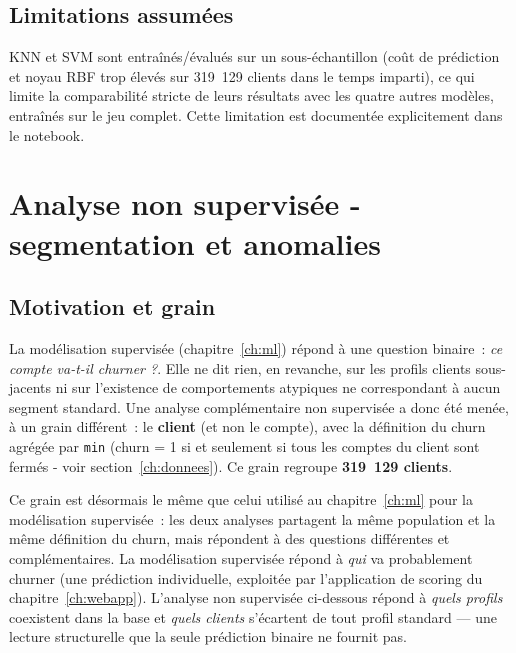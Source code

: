 \documentclass[11pt,a4paper]{report}
\begin{document}
\section{Limitations assum\'ees}

KNN et SVM sont entra\^in\'es/\'evalu\'es sur un sous-\'echantillon (co\^ut de
pr\'ediction et noyau RBF trop \'elev\'es sur 319~129 clients dans le temps
imparti), ce qui limite la comparabilit\'e stricte de leurs r\'esultats avec les
quatre autres mod\`eles, entra\^in\'es sur le jeu complet. Cette limitation est
document\'ee explicitement dans le notebook.

\chapter{Analyse non supervis\'ee - segmentation et anomalies}
\label{ch:datamining}

\section{Motivation et grain}

La mod\'elisation supervis\'ee (chapitre~\ref{ch:ml}) r\'epond \`a une question
binaire~: \emph{ce compte va-t-il churner ?}. Elle ne dit rien, en revanche,
sur les profils clients sous-jacents ni sur l'existence de comportements
atypiques ne correspondant \`a aucun segment standard. Une analyse
compl\'ementaire non supervis\'ee a donc \'et\'e men\'ee, \`a un grain diff\'erent~:
le \textbf{client} (et non le compte), avec la d\'efinition du churn agr\'eg\'ee
par \texttt{min} (churn = 1 si et seulement si tous les comptes du client sont
ferm\'es - voir section~\ref{ch:donnees}). Ce grain regroupe
\textbf{319~129 clients}.

Ce grain est d\'esormais le m\^eme que celui utilis\'e au chapitre~\ref{ch:ml}
pour la mod\'elisation supervis\'ee~: les deux analyses partagent la m\^eme
population et la m\^eme d\'efinition du churn, mais r\'epondent \`a des questions
diff\'erentes et compl\'ementaires. La mod\'elisation supervis\'ee r\'epond \`a
\emph{qui} va probablement churner (une pr\'ediction individuelle, exploit\'ee
par l'application de scoring du chapitre~\ref{ch:webapp}). L'analyse non
supervis\'ee ci-dessous r\'epond \`a \emph{quels profils} coexistent dans la
base et \emph{quels clients} s'\'ecartent de tout profil standard --- une
lecture structurelle que la seule pr\'ediction binaire ne fournit pas.
\end{document}
